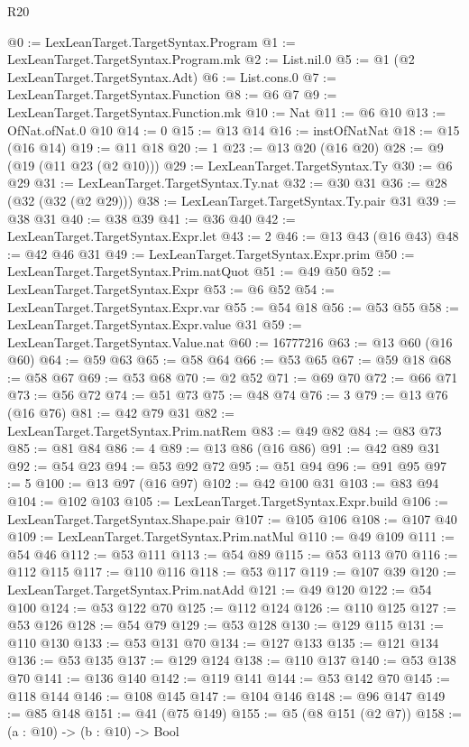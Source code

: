 \begin{lexlean}{R20}
\begin{coremodule}
@0 := LexLeanTarget.TargetSyntax.Program
@1 := LexLeanTarget.TargetSyntax.Program.mk
@2 := List.nil.{0}
@5 := @1 (@2 LexLeanTarget.TargetSyntax.Adt)
@6 := List.cons.{0}
@7 := LexLeanTarget.TargetSyntax.Function
@8 := @6 @7
@9 := LexLeanTarget.TargetSyntax.Function.mk
@10 := Nat
@11 := @6 @10
@13 := OfNat.ofNat.{0} @10
@14 := 0
@15 := @13 @14
@16 := instOfNatNat
@18 := @15 (@16 @14)
@19 := @11 @18
@20 := 1
@23 := @13 @20 (@16 @20)
@28 := @9 (@19 (@11 @23 (@2 @10)))
@29 := LexLeanTarget.TargetSyntax.Ty
@30 := @6 @29
@31 := LexLeanTarget.TargetSyntax.Ty.nat
@32 := @30 @31
@36 := @28 (@32 (@32 (@2 @29)))
@38 := LexLeanTarget.TargetSyntax.Ty.pair @31
@39 := @38 @31
@40 := @38 @39
@41 := @36 @40
@42 := LexLeanTarget.TargetSyntax.Expr.let
@43 := 2
@46 := @13 @43 (@16 @43)
@48 := @42 @46 @31
@49 := LexLeanTarget.TargetSyntax.Expr.prim
@50 := LexLeanTarget.TargetSyntax.Prim.natQuot
@51 := @49 @50
@52 := LexLeanTarget.TargetSyntax.Expr
@53 := @6 @52
@54 := LexLeanTarget.TargetSyntax.Expr.var
@55 := @54 @18
@56 := @53 @55
@58 := LexLeanTarget.TargetSyntax.Expr.value @31
@59 := LexLeanTarget.TargetSyntax.Value.nat
@60 := 16777216
@63 := @13 @60 (@16 @60)
@64 := @59 @63
@65 := @58 @64
@66 := @53 @65
@67 := @59 @18
@68 := @58 @67
@69 := @53 @68
@70 := @2 @52
@71 := @69 @70
@72 := @66 @71
@73 := @56 @72
@74 := @51 @73
@75 := @48 @74
@76 := 3
@79 := @13 @76 (@16 @76)
@81 := @42 @79 @31
@82 := LexLeanTarget.TargetSyntax.Prim.natRem
@83 := @49 @82
@84 := @83 @73
@85 := @81 @84
@86 := 4
@89 := @13 @86 (@16 @86)
@91 := @42 @89 @31
@92 := @54 @23
@94 := @53 @92 @72
@95 := @51 @94
@96 := @91 @95
@97 := 5
@100 := @13 @97 (@16 @97)
@102 := @42 @100 @31
@103 := @83 @94
@104 := @102 @103
@105 := LexLeanTarget.TargetSyntax.Expr.build
@106 := LexLeanTarget.TargetSyntax.Shape.pair
@107 := @105 @106
@108 := @107 @40
@109 := LexLeanTarget.TargetSyntax.Prim.natMul
@110 := @49 @109
@111 := @54 @46
@112 := @53 @111
@113 := @54 @89
@115 := @53 @113 @70
@116 := @112 @115
@117 := @110 @116
@118 := @53 @117
@119 := @107 @39
@120 := LexLeanTarget.TargetSyntax.Prim.natAdd
@121 := @49 @120
@122 := @54 @100
@124 := @53 @122 @70
@125 := @112 @124
@126 := @110 @125
@127 := @53 @126
@128 := @54 @79
@129 := @53 @128
@130 := @129 @115
@131 := @110 @130
@133 := @53 @131 @70
@134 := @127 @133
@135 := @121 @134
@136 := @53 @135
@137 := @129 @124
@138 := @110 @137
@140 := @53 @138 @70
@141 := @136 @140
@142 := @119 @141
@144 := @53 @142 @70
@145 := @118 @144
@146 := @108 @145
@147 := @104 @146
@148 := @96 @147
@149 := @85 @148
@151 := @41 (@75 @149)
@155 := @5 (@8 @151 (@2 @7))
@158 := (a : @10) -> (b : @10) -> Bool

\end{coremodule}
\end{lexlean}
